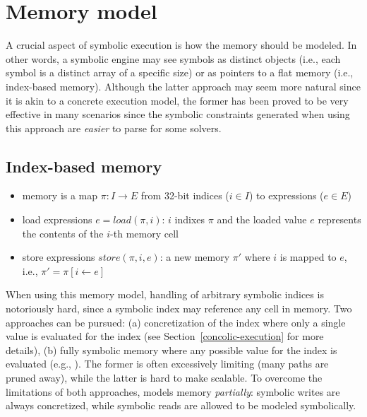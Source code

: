 
\section{Memory model}
\label{memory-model}

A crucial aspect of symbolic execution is how the memory should be modeled. In other words, a symbolic engine may see symbols as distinct objects (i.e., each symbol is a distinct array of a specific size) or as pointers to a flat memory (i.e., index-based memory). Although the latter approach may seem more natural since it is akin to a concrete execution model, the former has been proved to be very effective in many scenarios since the symbolic constraints generated when using this approach are {\em easier} to parse for some solvers.

\subsection{Index-based memory}

\begin{itemize}
  \item memory is a map $\pi : I \to E$ from 32-bit indices ($i \in I$) to expressions ($e \in E$)
  \item load expressions $e = load(\pi, i)$: $i$ indixes $\pi$ and the loaded value $e$ represents the contents of the $i$-th memory cell
  \item store expressions $store(\pi, i, e)$: a new memory $\pi'$ where $i$ is mapped to $e$, i.e., $\pi' = \pi[i \gets e]$
\end{itemize}
When using this memory model, handling of arbitrary symbolic indices is notoriously hard, since a symbolic index may reference any cell in memory. Two approaches can be pursued: (a) concretization of the index where only a single value is evaluated for the index (see Section~\ref{concolic-execution} for more details), (b) fully symbolic memory where any possible value for the index is evaluated (e.g., \cite{BAP-CAV11}). The former is often excessively limiting (many paths are pruned away), while the latter is hard to make scalable. To overcome the limitations of both approaches, \cite{MAYHEM-SP12} models memory {\em partially}: symbolic writes are always concretized, while symbolic reads are allowed to be modeled symbolically.


